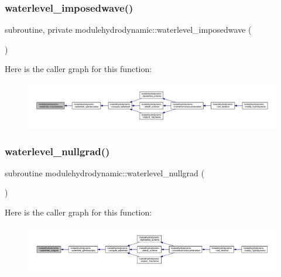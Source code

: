\subsubsection{\texorpdfstring{waterlevel\+\_\+imposedwave()}{waterlevel\_imposedwave()}}
{\footnotesize\ttfamily subroutine, private modulehydrodynamic\+::waterlevel\+\_\+imposedwave (\begin{DoxyParamCaption}{ }\end{DoxyParamCaption})\hspace{0.3cm}{\ttfamily [private]}}

Here is the caller graph for this function\+:\nopagebreak
\begin{figure}[H]
\begin{center}
\leavevmode
\includegraphics[width=350pt]{namespacemodulehydrodynamic_a25549ff328b3933642ae5a9112a7d2ba_icgraph}
\end{center}
\end{figure}
\mbox{\label{namespacemodulehydrodynamic_a3a81c2f0eddf64c038d5a82241029379}} 
\subsubsection{\texorpdfstring{waterlevel\+\_\+nullgrad()}{waterlevel\_nullgrad()}}
{\footnotesize\ttfamily subroutine modulehydrodynamic\+::waterlevel\+\_\+nullgrad (\begin{DoxyParamCaption}{ }\end{DoxyParamCaption})\hspace{0.3cm}{\ttfamily [private]}}

Here is the caller graph for this function\+:\nopagebreak
\begin{figure}[H]
\begin{center}
\leavevmode
\includegraphics[width=350pt]{namespacemodulehydrodynamic_a3a81c2f0eddf64c038d5a82241029379_icgraph}
\end{center}
\end{figure}
\mbox{\label{namespacemodulehydrodynamic_abc3f56e92d973f39a2bde89ee0ee561f}} 
